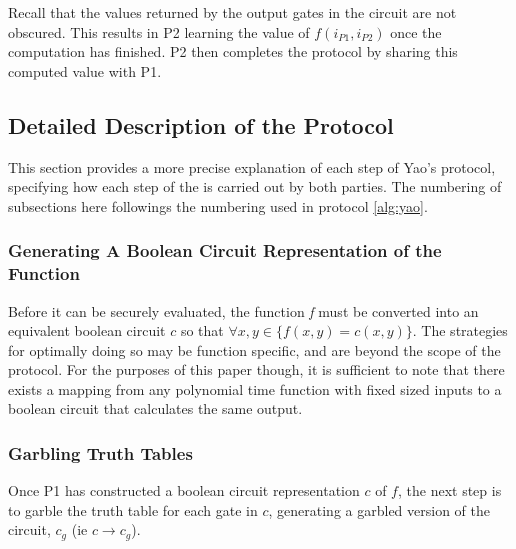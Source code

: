 Recall that the values returned by the output gates in the circuit are not obscured. This results in \ac{P2} learning the value of $f(i_{P1}, i_{P2})$ once the computation has finished.  \ac{P2} then completes the protocol by sharing this computed value with \ac{P1}.


\subsection{Detailed Description of the Protocol}

This section provides a more precise explanation of each step of Yao's protocol, specifying how each step of the is carried out by both parties.  The numbering of subsections here followings the numbering used in protocol \ref{alg:yao}.


\subsubsection{Generating A Boolean Circuit Representation of the Function}

Before it can be securely evaluated, the function \emph{f} must be converted into an equivalent boolean circuit $c$ so that $\forall x, y \in \{f(x, y) = c(x, y)\}$. The strategies for optimally doing so may be function specific, and are beyond the scope of the protocol.  For the purposes of this paper though, it is sufficient to note that there exists a mapping from any polynomial time function with fixed sized inputs to a boolean circuit that calculates the same output\cite{goldreich1987play}.


\subsubsection{Garbling Truth Tables}

Once \ac{P1} has constructed a boolean circuit representation $c$ of $f$, the next step is to garble the truth table for each gate in $c$, generating a garbled version of the circuit, $c_g$ (ie $c \to c_g$).

